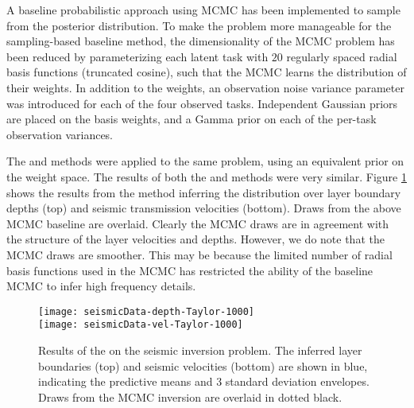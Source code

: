 
A baseline probabilistic approach using MCMC has been implemented to sample
from the posterior distribution. To make the problem more manageable for the
sampling-based baseline method, the dimensionality of the MCMC problem has been
reduced by parameterizing each latent task with $20$ regularly spaced radial
basis functions (truncated cosine), such that the MCMC learns the distribution
of their weights. In addition to the weights, an observation noise variance
parameter was introduced for each of the four observed tasks. Independent
Gaussian priors are placed on the basis weights, and a Gamma prior on each of
the per-task observation variances.

The \eks and \uks methods were applied to the same problem, using an equivalent 
prior on the weight space.
The results of both the \eks and \uks methods were very similar. Figure 
\ref{fig:seismic_result} shows the results from the \eks method inferring the 
distribution over layer boundary depths (top) and seismic transmission 
velocities (bottom). Draws from the above MCMC baseline are overlaid. Clearly
the MCMC draws are in agreement with the structure of the layer velocities and 
depths. However, we do note that the MCMC draws are smoother. This may be 
because the limited number of radial basis functions used in the MCMC has 
restricted the ability of the baseline MCMC to infer high frequency details.

\begin{figure}
\texttt{[image: seismicData-depth-Taylor-1000]} \\
\texttt{[image: seismicData-vel-Taylor-1000]}
\caption{Results of the \eks on the seismic inversion problem. The inferred 
    layer boundaries (top) and seismic velocities (bottom) are shown in blue, 
    indicating the predictive means and 3 standard deviation envelopes. Draws
    from the MCMC inversion are overlaid in dotted black.}
 \label{fig:seismic_result}
\end{figure}

